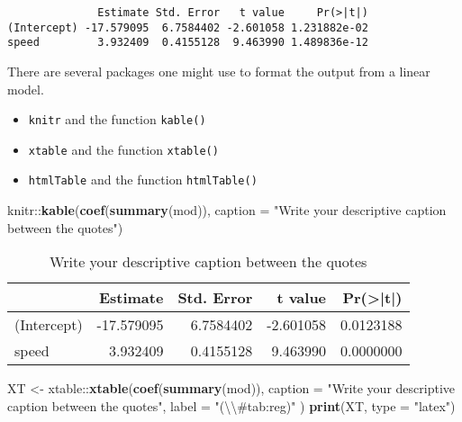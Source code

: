 \documentclass[]{article}
\newenvironment{Shaded}{\begin{snugshade}}{\end{snugshade}}
\newcommand{\KeywordTok}[1]{\textcolor[rgb]{0.13,0.29,0.53}{\textbf{{#1}}}}
\newcommand{\DataTypeTok}[1]{\textcolor[rgb]{0.13,0.29,0.53}{{#1}}}
\newcommand{\CharTok}[1]{\textcolor[rgb]{0.31,0.60,0.02}{{#1}}}
\newcommand{\StringTok}[1]{\textcolor[rgb]{0.31,0.60,0.02}{{#1}}}
\newcommand{\NormalTok}[1]{{#1}}
\providecommand{\tightlist}{%
  \setlength{\itemsep}{0pt}\setlength{\parskip}{0pt}}
\begin{document}
\begin{verbatim}
              Estimate Std. Error   t value     Pr(>|t|)
(Intercept) -17.579095  6.7584402 -2.601058 1.231882e-02
speed         3.932409  0.4155128  9.463990 1.489836e-12
\end{verbatim}

There are several packages one might use to format the output from a
linear model.

\begin{itemize}
\tightlist
\item
  \texttt{knitr} and the function \texttt{kable()}
\item
  \texttt{xtable} and the function \texttt{xtable()}
\item
  \texttt{htmlTable} and the function \texttt{htmlTable()}
\end{itemize}

\begin{Shaded}
\begin{Highlighting}[]
\NormalTok{knitr::}\KeywordTok{kable}\NormalTok{(}\KeywordTok{coef}\NormalTok{(}\KeywordTok{summary}\NormalTok{(mod)), }\DataTypeTok{caption =} \StringTok{"Write your descriptive caption between the quotes"}\NormalTok{)}
\end{Highlighting}
\end{Shaded}

\begin{table}

\caption{\label{tab:unnamed-chunk-1}Write your descriptive caption between the quotes}
\centering
\begin{tabular}[t]{l|r|r|r|r}
\hline
  & Estimate & Std. Error & t value & Pr(>|t|)\\
\hline
(Intercept) & -17.579095 & 6.7584402 & -2.601058 & 0.0123188\\
\hline
speed & 3.932409 & 0.4155128 & 9.463990 & 0.0000000\\
\hline
\end{tabular}
\end{table}

\begin{Shaded}
\begin{Highlighting}[]
\NormalTok{XT <-}\StringTok{ }\NormalTok{xtable::}\KeywordTok{xtable}\NormalTok{(}\KeywordTok{coef}\NormalTok{(}\KeywordTok{summary}\NormalTok{(mod)), }\DataTypeTok{caption =} \StringTok{"Write your descriptive caption between the quotes"}\NormalTok{, }\DataTypeTok{label =} \StringTok{"(}\CharTok{\textbackslash{}\textbackslash{}}\StringTok{#tab:reg)"} \NormalTok{)}
\KeywordTok{print}\NormalTok{(XT, }\DataTypeTok{type =} \StringTok{"latex"}\NormalTok{)}
\end{Highlighting}
\end{Shaded}
\end{document}
